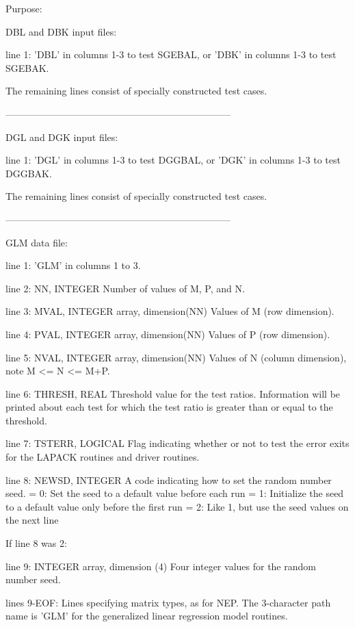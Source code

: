 \begin{DoxyParagraph}{Purpose\+: }
\begin{DoxyVerb}
 DBL and DBK input files:

 line 1:  'DBL' in columns 1-3 to test SGEBAL, or 'DBK' in
          columns 1-3 to test SGEBAK.

 The remaining lines consist of specially constructed test cases.

-----------------------------------------------------------------------

 DGL and DGK input files:

 line 1:  'DGL' in columns 1-3 to test DGGBAL, or 'DGK' in
          columns 1-3 to test DGGBAK.

 The remaining lines consist of specially constructed test cases.

-----------------------------------------------------------------------

 GLM data file:

 line 1:  'GLM' in columns 1 to 3.

 line 2:  NN, INTEGER
          Number of values of M, P, and N.

 line 3:  MVAL, INTEGER array, dimension(NN)
          Values of M (row dimension).

 line 4:  PVAL, INTEGER array, dimension(NN)
          Values of P (row dimension).

 line 5:  NVAL, INTEGER array, dimension(NN)
          Values of N (column dimension), note M <= N <= M+P.

 line 6:  THRESH, REAL
          Threshold value for the test ratios.  Information will be
          printed about each test for which the test ratio is greater
          than or equal to the threshold.

 line 7:  TSTERR, LOGICAL
          Flag indicating whether or not to test the error exits for
          the LAPACK routines and driver routines.

 line 8:  NEWSD, INTEGER
          A code indicating how to set the random number seed.
          = 0:  Set the seed to a default value before each run
          = 1:  Initialize the seed to a default value only before the
                first run
          = 2:  Like 1, but use the seed values on the next line

 If line 8 was 2:

 line 9:  INTEGER array, dimension (4)
          Four integer values for the random number seed.

 lines 9-EOF:  Lines specifying matrix types, as for NEP.
          The 3-character path name is 'GLM' for the generalized
          linear regression model routines.


\end{DoxyVerb}
\end{DoxyParagraph}
